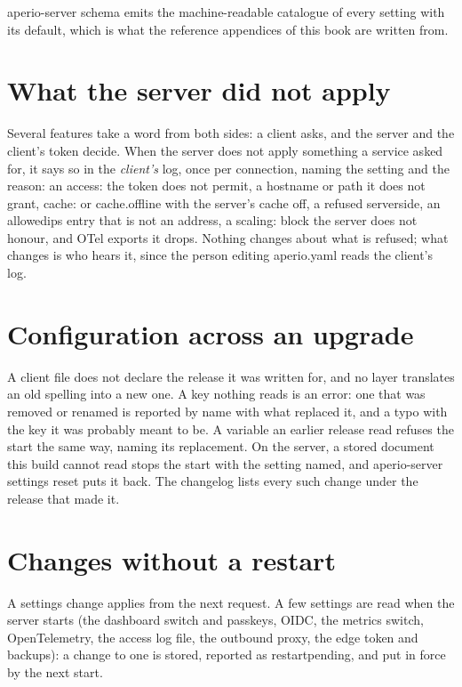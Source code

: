 \documentclass[11pt,a4paper,oneside]{book}
\newcommand{\aperiobreakableunderscore}{\textunderscore\allowbreak}
\newcommand{\aperiocodebreaks}{\XeTeXinterchartokenstate=1 }
\newcommand{\aperiocodebreaks}{}
\DeclareRobustCommand{\code}[1]{{\ttfamily\small\aperiocodebreaks
  \let\_\aperiobreakableunderscore#1}}
\begin{document}
\code{aperio-server schema} emits the machine-readable catalogue of every
setting with its default, which is what the reference appendices of this book
are written from.

\section{What the server did not apply}

Several features take a word from both sides: a client asks, and the server
and the client's token decide. When the server does not apply something a
service asked for, it says so in the \emph{client's} log, once per
connection, naming the setting and the reason: an \code{access:} the token
does not permit, a hostname or path it does not grant, \code{cache:} or
\code{cache.offline} with the server's cache off, a refused
\code{server\_side}, an \code{allowed\_ips} entry that is not an address, a
\code{scaling:} block the server does not honour, and OTel exports it
drops. Nothing changes about what is refused; what changes is who hears it,
since the person editing \code{aperio.yaml} reads the client's log.

\section{Configuration across an upgrade}

A client file does not declare the release it was written for, and no layer
translates an old spelling into a new one. A key nothing reads is an error:
one that was removed or renamed is reported by name with what replaced it,
and a typo with the key it was probably meant to be. A variable an earlier
release read refuses the start the same way, naming its replacement. On the server, a stored document
this build cannot read stops the start with the setting named, and
\code{aperio-server settings reset} puts it back. The changelog lists every
such change under the release that made it.

\section{Changes without a restart}

A settings change applies from the next request. A few settings are read when
the server starts (the dashboard switch and passkeys, OIDC, the metrics switch,
OpenTelemetry, the access log file, the outbound proxy, the edge token and
backups): a change to one is stored, reported as \code{restart\_pending}, and
put in force by the next start.
\end{document}
